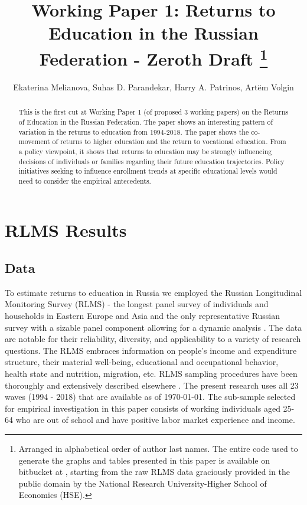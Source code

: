 \documentclass[12pt,a4paper]{article}
\numberwithin{equation}{section}
\begin{document}
\title{Working Paper 1: Returns to Education in the Russian Federation - Zeroth Draft \footnote{Arranged in alphabetical order of author last names. The entire code used to generate the graphs and tables presented in this paper is available on bitbucket at  , starting from the raw RLMS data graciously provided in the public domain by the National Research University-Higher School of Economics (HSE).}}
\author{Ekaterina Melianova, Suhas D. Parandekar, Harry A. Patrinos, Art\"{e}m Volgin}
\maketitle
\begin{abstract}
This is the first cut at Working Paper 1 (of proposed 3 working papers) on the Returns of Education in the Russian Federation. The paper shows an interesting pattern of variation in the returns to education from 1994-2018. The paper shows the co-movement of returns to higher education and the return to vocational education. From a policy viewpoint, it shows that returns to education may be strongly influencing decisions of individuals or families regarding their future education trajectories. Policy initiatives seeking to influence enrollment trends at specific educational levels would need to consider the empirical antecedents. 
\end{abstract}


\section{RLMS Results}

\subsection{Data}

To estimate returns to education in Russia we employed the Russian Longitudinal 
Monitoring Survey (RLMS) - the longest panel survey of individuals and 
households in Eastern Europe and Asia and the only representative Russian 
survey with a sizable panel component allowing for a dynamic analysis 
\parencite{kozyreva_081._2015}. The data are notable for their reliability, 
diversity, and applicability to a variety of research questions. The RLMS 
embraces information on people's income and expenditure structure, their 
material well-being, educational and occupational behavior, health state and 
nutrition, migration, etc.  RLMS sampling procedures have been thoroughly and 
extensively described elsewhere \parencite{kozyreva_081._2015}. The present 
research uses all 23 waves (1994 - 2018) that are available as of \today. The 
sub-sample selected for empirical investigation  in this paper consists of 
working individuals aged 25-64 who are out of school and have positive labor 
market experience and income.
\\
\end{document}
